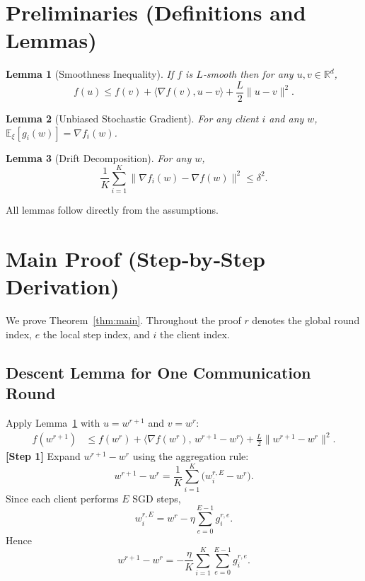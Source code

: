 \documentclass{article}
\newtheorem{lemma}{Lemma}
\newcommand{\EE}{\mathbb{E}}
\newcommand{\RR}{\mathbb{R}}
\begin{document}
\newpage

\section*{Preliminaries (Definitions and Lemmas)}
\begin{lemma}[Smoothness Inequality]\label{lem:smooth}
If $f$ is $L$‑smooth then for any $u,v\in\RR^{d}$,
\[
    f(u)\le f(v)+\langle\nabla f(v),u-v\rangle+\frac{L}{2}\|u-v\|^{2}.
\]
\end{lemma}
\begin{lemma}[Unbiased Stochastic Gradient]\label{lem:unbiased}
For any client $i$ and any $w$, $\EE_{\xi}[g_{i}(w)]=\nabla f_i(w)$.
\end{lemma}
\begin{lemma}[Drift Decomposition]\label{lem:drift}
For any $w$,
\[
\frac1K\sum_{i=1}^{K}\|\nabla f_i(w)-\nabla f(w)\|^{2}\le\delta^{2}.
\]
\end{lemma}
All lemmas follow directly from the assumptions.

\newpage

\section*{Main Proof (Step‑by‑Step Derivation)}
We prove Theorem~\ref{thm:main}. Throughout the proof $r$ denotes the global round index, $e$ the local step index, and $i$ the client index.

\subsection*{Descent Lemma for One Communication Round}
Apply Lemma~\ref{lem:smooth} with $u=w^{r+1}$ and $v=w^{r}$:
\begin{align}
    f(w^{r+1})
    &\le f(w^{r})+\big\langle\nabla f(w^{r}),\,w^{r+1}-w^{r}\big\rangle
       +\frac{L}{2}\|w^{r+1}-w^{r}\|^{2}. \tag{2}
\end{align}
\noindent\textbf{[Step 1]} Expand $w^{r+1}-w^{r}$ using the aggregation rule:
\[
    w^{r+1}-w^{r}
    =\frac1K\sum_{i=1}^{K}\big(w_{i}^{r,E}-w^{r}\big).
\]
Since each client performs $E$ SGD steps,
\[
    w_{i}^{r,E}=w^{r}-\eta\sum_{e=0}^{E-1}g_{i}^{r,e}.
\]
Hence
\[
    w^{r+1}-w^{r}= -\frac{\eta}{K}\sum_{i=1}^{K}\sum_{e=0}^{E-1} g_{i}^{r,e}. \tag{3}
\]
\end{document}
